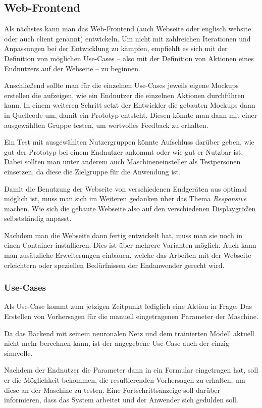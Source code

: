 \subsection{Web-Frontend}
\label{subsec:webseite}
Als nächstes kann man das Web-Frontend (auch Webseite oder englisch website oder auch client genannt) entwickeln. Um
nicht mit zahlreichen Iterationen und Anpassungen bei der Entwicklung zu kämpfen, empfiehlt es sich mit der Definition
von möglichen Use-Cases -- also mit der Definition von Aktionen eines Endnutzers auf der Webseite -- zu beginnen.

Anschließend sollte man für die einzelnen Use-Cases jeweils eigene Mockups erstellen die aufzeigen, wie ein Endnutzer
die einzelnen Aktionen durchführen kann. In einem weiteren Schritt setzt der Entwickler die gebauten Mockups dann in
Quellcode um, damit ein Prototyp entsteht. Diesen könnte man dann mit einer ausgewählten Gruppe testen, um wertvolles
Feedback zu erhalten.

Ein Test mit ausgewählten Nutzergruppen könnte Aufschluss darüber geben, wie gut der Prototyp bei einem Endnutzer
ankommt oder wie gut er Nutzbar ist. Dabei sollten man unter anderem auch Maschineneinsteller als Testpersonen
einsetzen, da diese die Zielgruppe für die Anwendung ist.

Damit die Benutzung der Webseite von verschiedenen Endgeräten aus optimal möglich ist, muss man sich im Weiteren
gedanken über das Thema \textit{Responsive} machen. Wie sich die gebaute Webseite also auf den verschiedenen
Displaygrößen selbstständig anpasst.

Nachdem man die Webseite dann fertig entwickelt hat, muss man sie noch in einen Container installieren. Dies ist über
mehrere Varianten möglich. Auch kann man zusätzliche Erweiterungen einbauen, welche das Arbeiten mit der Webseite
erleichtern oder speziellen Bedürfnissen der Endanwender gerecht wird.

\subsubsection{Use-Cases}
Als Use-Case kommt zum jetzigen Zeitpunkt lediglich eine Aktion in Frage. Das Erstellen von Vorhersagen für die manuell
eingetragenen Parameter der Maschine.

Da das Backend mit seinem neuronalen Netz und dem trainierten Modell aktuell nicht mehr berechnen kann, ist der
angegebene Use-Case auch der einzig sinnvolle.

Nachdem der Endnutzer die Parameter dann in ein Formular eingetragen hat, soll er die Möglichkeit bekommen, die
resultierenden Vorhersagen zu erhalten, um diese an der Maschine zu testen. Eine Fortschrittsanzeige soll darüber
informieren, dass das System arbeitet und der Anwender sich gedulden soll.

